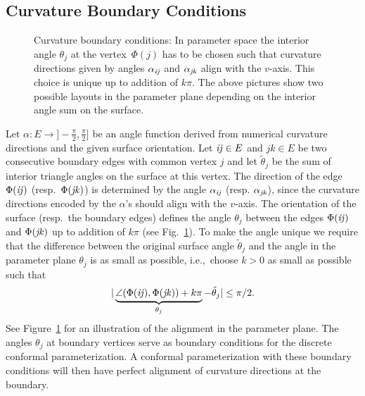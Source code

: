 \subsection{Curvature Boundary Conditions}
\label{sub:boundary}

\begin{figure}
\centering 

\caption{Curvature boundary conditions: In parameter space the interior angle 
$\theta_j$ at the vertex~$\Phi(j)$ has to be chosen such that curvature 
directions given by angles $\alpha_{\mathrm{\it{ij}}}$ and $\alpha_{\mathrm{\it{jk}}}$ align with the 
$v$-axis. This choice is unique up to addition
of $k \pi$. The above pictures show two possible layouts in the parameter
plane depending on the interior angle sum on the surface.}
\label{fig:boundary_angles}
\end{figure}

Let $\alpha:E\to ]-\frac{\pi}{2},\frac{\pi}{2}]$ be an angle function derived
from numerical curvature directions and the given surface orientation. 
Let $\mathrm{\it{ij}}\in E$ and $jk\in E$ be two consecutive boundary edges with common
vertex $j$ and let $\tilde\theta_j$ be the sum of interior triangle angles on
the surface at this vertex.  The direction of the edge $\Phi(\mathrm{\it{ij}})$ (resp.\
$\Phi(\mathrm{\it{jk}})$) is determined by the angle $\alpha_{\mathrm{\it{ij}}}$ 
(resp. $\alpha_{\mathrm{\it{jk}}}$),
since the curvature directions encoded by the $\alpha$'s should align with the
$v$-axis. The orientation of the surface (resp.\ the boundary edges) defines
the angle $\theta_j$ between the edges $\Phi(\mathrm{\it{ij}})$ and $\Phi(\mathrm{\it{jk}})$ up to
addition of $k \pi$ (see Fig.~\ref{fig:boundary_angles}). To make the angle
unique we require that the difference between the original surface angle
$\tilde\theta_j$ and the angle in the parameter plane $\theta_j$ is as small
as possible, i.e.,\ choose $k>0$ as small as possible such that 
\[
|\underbrace{\angle(\Phi(\mathrm{\it{ij}}),\Phi(\mathrm{\it{jk}}))+ k \pi}_{\theta_j} - \tilde\theta_j| \le \pi/2.
\]
See Figure~\ref{fig:boundary_angles} for an
illustration of the alignment in the parameter plane. The angles $\theta_j$ at
boundary vertices serve as boundary conditions for the discrete conformal
parameterization. A conformal parameterization with these boundary conditions
will then have perfect alignment of curvature directions at the boundary.

